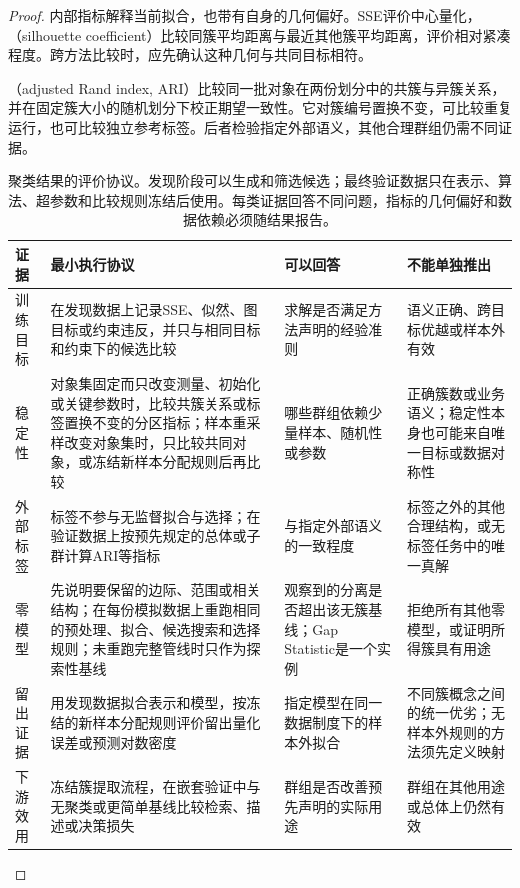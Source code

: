 \begin{proof}
内部指标解释当前拟合，也带有自身的几何偏好。SSE评价中心量化，（silhouette coefficient）比较同簇平均距离与最近其他簇平均距离，评价相对紧凑程度。跨方法比较时，应先确认这种几何与共同目标相符。

（adjusted Rand index, ARI）比较同一批对象在两份划分中的共簇与异簇关系，并在固定簇大小的随机划分下校正期望一致性。它对簇编号置换不变，可比较重复运行，也可比较独立参考标签。后者检验指定外部语义，其他合理群组仍需不同证据。

\begin{table}[htbp]
  \centering
  \small
  \begin{tabularx}{\linewidth}{@{}>{\RaggedRight\arraybackslash}p{21mm}>{\RaggedRight\arraybackslash}p{43mm}>{\RaggedRight\arraybackslash}X>{\RaggedRight\arraybackslash}X@{}}
    \toprule
    证据 & 最小执行协议 & 可以回答 & 不能单独推出 \\
    \midrule
    训练目标 & 在发现数据上记录SSE、似然、图目标或约束违反，并只与相同目标和约束下的候选比较 & 求解是否满足方法声明的经验准则 & 语义正确、跨目标优越或样本外有效 \\
    稳定性 & 对象集固定而只改变测量、初始化或关键参数时，比较共簇关系或标签置换不变的分区指标；样本重采样改变对象集时，只比较共同对象，或冻结新样本分配规则后再比较 & 哪些群组依赖少量样本、随机性或参数 & 正确簇数或业务语义；稳定性本身也可能来自唯一目标或数据对称性 \\
    外部标签 & 标签不参与无监督拟合与选择；在验证数据上按预先规定的总体或子群计算ARI等指标 & 与指定外部语义的一致程度 & 标签之外的其他合理结构，或无标签任务中的唯一真解 \\
    零模型 & 先说明要保留的边际、范围或相关结构；在每份模拟数据上重跑相同的预处理、拟合、候选搜索和选择规则；未重跑完整管线时只作为探索性基线 & 观察到的分离是否超出该无簇基线；Gap Statistic是一个实例 & 拒绝所有其他零模型，或证明所得簇具有用途 \\
    留出证据 & 用发现数据拟合表示和模型，按冻结的新样本分配规则评价留出量化误差或预测对数密度 & 指定模型在同一数据制度下的样本外拟合 & 不同簇概念之间的统一优劣；无样本外规则的方法须先定义映射 \\
    下游效用 & 冻结簇提取流程，在嵌套验证中与无聚类或更简单基线比较检索、描述或决策损失 & 群组是否改善预先声明的实际用途 & 群组在其他用途或总体上仍然有效 \\
    \bottomrule
  \end{tabularx}
  \caption{聚类结果的评价协议。发现阶段可以生成和筛选候选；最终验证数据只在表示、算法、超参数和比较规则冻结后使用。每类证据回答不同问题，指标的几何偏好和数据依赖必须随结果报告。}
  \label{tab:clustering-evaluation-protocol}
\end{table}


\end{proof}
